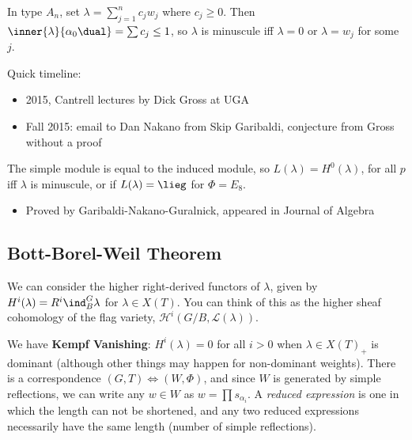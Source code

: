 \begin{example}

In type \(A_n\), set \(\lambda = \sum_{j=1}^n c_j w_j\) where
\(c_j \geq 0\). Then
\(\inner{\lambda}{\alpha_0\dual} = \sum c_j \leq 1\), so \(\lambda\) is
minuscule iff \(\lambda = 0\) or \(\lambda = w_j\) for some \(j\).

\end{example}

\begin{remark}

Quick timeline:

\begin{itemize}
\tightlist
\item
  2015, Cantrell lectures by Dick Gross at UGA
\item
  Fall 2015: email to Dan Nakano from Skip Garibaldi, conjecture from
  Gross without a proof
\end{itemize}

\begin{proposition}[Gross]

The simple module is equal to the induced module, so
\(L(\lambda) = H^0(\lambda)\), for all \(p\) iff \(\lambda\) is
minuscule, or if \(L(\lambda) = \lieg\) for \(\Phi = E_8\).

\end{proposition}

\begin{itemize}
\tightlist
\item
  Proved by Garibaldi-Nakano-Guralnick, appeared in Journal of Algebra
\end{itemize}

\end{remark}

\hypertarget{bott-borel-weil-theorem}{%
\subsection{Bott-Borel-Weil Theorem}\label{bott-borel-weil-theorem}}

We can consider the higher right-derived functors of \(\lambda\), given
by \(H^i(\lambda) = R^i \ind_B^G \lambda\) for \(\lambda \in X(T)\). You
can think of this as the higher sheaf cohomology of the flag variety,
\(\mathcal{H}^i(G/B, \mathcal{L}(\lambda))\).

We have \textbf{Kempf Vanishing}: \(H^i(\lambda) = 0\) for all \(i>0\)
when \(\lambda \in X(T)_+\) is dominant (although other things may
happen for non-dominant weights). There is a correspondence
\((G, T) \iff (W, \Phi)\), and since \(W\) is generated by simple
reflections, we can write any \(w\in W\) as \(w=\prod s_{\alpha_i}\). A
\emph{reduced expression} is one in which the length can not be
shortened, and any two reduced expressions necessarily have the same
length (number of simple reflections).

